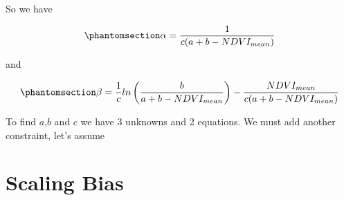 \documentclass[
  letterpaper,
  DIV=11,
  numbers=noendperiod]{scrartcl}
\begin{document}
So we have

\begin{equation}\phantomsection\label{eq-alinear}{
\alpha = \frac{1}{c(a+b-NDVI_{mean})}
}\end{equation}

and

\begin{equation}\phantomsection\label{eq-blinear}{
\beta = \frac{1}{c}ln\left(\frac{b}{a+b-NDVI_{mean}}\right)-\frac{NDVI_{mean}}{c(a+b-NDVI_{mean})}
}\end{equation}

To find \(a\),\(b\) and \(c\) we have 3 unknowns and 2 equations. We
must add another constraint, let's assume

\section{Scaling Bias}\label{scaling-bias}
\end{document}
